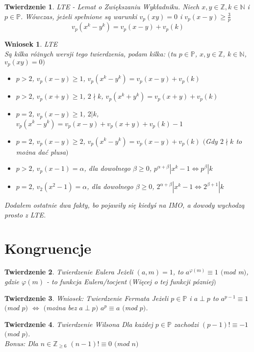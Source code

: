 \documentclass[10pt,a4paper]{article}
\newtheorem{theorem}{Twierdzenie}[section]
\newtheorem{corollary}{Wniosek}[theorem]
\newcommand{\N}{\mathbb{N}}
\newcommand{\Z}{\mathbb{Z}}
\newcommand{\p}{\mathbb{P}}
\begin{document}
\begin{theorem}{LTE - Lemat o Zwiększaniu Wykładniku.}
\color{black}
Niech ${x,y \in \Z, k \in \N}$ i ${p \in \p}$. Wówczas, jeżeli spełnione są warunki ${v_p(xy)=0}$ i ${v_p(x-y) \geq \frac{3}{p}}$
$${v_p(x^k-y^k)=v_p(x-y)+v_p(k)}$$
\end{theorem}
\begin{corollary}{LTE}
\color{black}
\\
Są kilka różnych wersji tego twierdzenia, podam kilka: $($tu $p \in \p$, $x,y \in \Z$, $k \in \N$, $v_p(xy)=0$$)$
\begin{itemize}
	\item
	$p >2$, $v_p(x-y) \geq 1$, $v_p(x^k-y^k)=v_p(x-y)+v_p(k)$ 
	\item
	$p >2$, $v_p(x+y) \geq 1$, $2 \nmid k$, $v_p(x^k+y^k)=v_p(x+y)+v_p(k)$
	\item 
	$p =2$, $v_p(x-y) \geq 1$, $2 | k$, $v_p(x^k-y^k)=v_p(x-y)+v_p(x+y)+v_p(k)-1$
	\item 
	$p =2$, $v_p(x-y) \geq 2$, $v_p(x^k-y^k)=v_p(x-y)+v_p(k)$ $($Gdy $2 \nmid k$ to można dać plusa$)$
	\item 
	$p >2$, $v_p(x-1) = \alpha$, dla dowolnego $\beta \geq 0$, $p^{\alpha+\beta}|x^k-1 \Leftrightarrow p^\beta|k$
	\item 
	$p =2$, $v_2(x^2-1) = \alpha$, dla dowolnego $\beta \geq 0$, $2^{\alpha+\beta}|x^k-1 \Leftrightarrow 2^{\beta+1}|k$
\end{itemize}
Dodałem ostatnie dwa fakty, bo pojawiły się kiedyś na IMO, a dowody wychodzą prosto z LTE.
\end{corollary}
\section{Kongruencje}
\begin{theorem}{Twierdzenie Eulera}
\color{black}
Jeżeli ${(a,m)=1}$, to ${a^{\varphi(m)} \equiv 1}$ $($mod m$)$, gdzie $\varphi(m)$ - to funkcja Eulera/tocjent $($Więcej o tej funkcji pózniej$)$
\end{theorem}

\begin{theorem}{Wniosek: Twierdzenie Fermata}
\color{black}
Jeżeli $p \in \p$ i $a \perp p$ to $a^{p-1} \equiv 1$ $($mod $p$$)$ $\Leftrightarrow$ $($można bez $a \perp p$$)$ $a^p \equiv a$ $($mod $p$$)$.
\end{theorem}
\begin{theorem}{Twierdzenie Wilsona}
\color{black}
Dla każdej $p \in \p$ zachodzi $(p-1)! \equiv -1$ $($mod $p$$)$.
\\ Bonus: Dla $n \in \Z_{\geq 6}$ $(n-1)! \equiv 0$ $($mod $n$$)$
\end{theorem}
\end{document}

